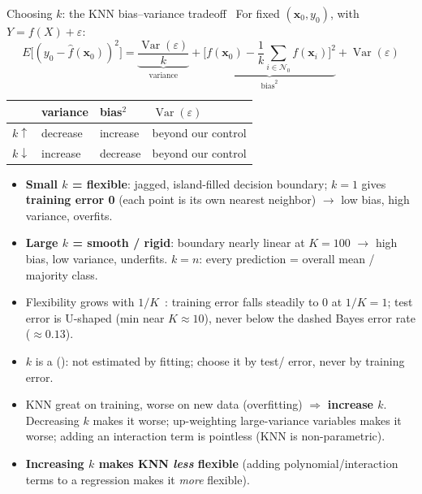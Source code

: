 \begin{topic}{Choosing $k$: the KNN bias--variance tradeoff \,}
For fixed $(\mathbf x_0,y_0)$, with $Y=f(X)+\varepsilon$:
\[ E\big[(y_0-\hat f(\mathbf x_0))^2\big]=\underbrace{\frac{\operatorname{Var}(\varepsilon)}{k}}_{\text{variance}}+\underbrace{\Big[f(\mathbf x_0)-\frac1k\sum_{i\in\mathcal N_0}f(\mathbf x_i)\Big]^2}_{\text{bias}^2}+\operatorname{Var}(\varepsilon) \]
\begin{tabular}{@{}llll@{}}
\toprule
 & variance & bias$^2$ & $\operatorname{Var}(\varepsilon)$\\\midrule
$k\uparrow$ & decrease & increase & beyond our control\\
$k\downarrow$ & increase & decrease & beyond our control\\\bottomrule
\end{tabular}
\begin{itemize}
\item \textbf{Small $k$ = flexible}: jagged, island-filled decision boundary; $k=1$ gives \textbf{training error 0} (each point is its own nearest neighbor) $\to$ low bias, high variance, overfits.
\item \textbf{Large $k$ = smooth / rigid}: boundary nearly linear at $K=100$ $\to$ high bias, low variance, underfits. $k=n$: every prediction = overall mean / majority class.
\item Flexibility grows with $1/K$ \,: training error falls steadily to 0 at $1/K=1$; test error is U-shaped (min near $K\approx10$), never below the dashed Bayes error rate ($\approx0.13$).
\item $k$ is a  (): not estimated by fitting; choose it by test/ error, never by training error.
\end{itemize}
\end{topic}

\begin{trap}
\begin{itemize}
\item KNN great on training, worse on new data (overfitting) $\Rightarrow$ \textbf{increase $k$}. Decreasing $k$ makes it worse; up-weighting large-variance variables makes it worse; adding an interaction term is pointless (KNN is non-parametric).
\item \textbf{Increasing $k$ makes KNN \emph{less} flexible} (adding polynomial/interaction terms to a regression makes it \emph{more} flexible).
\end{itemize}
\end{trap}

